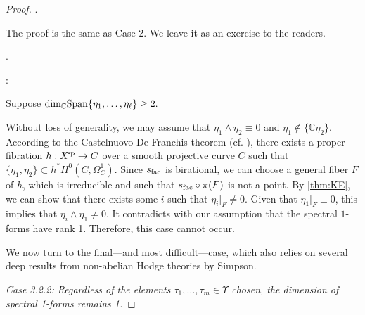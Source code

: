 \documentclass[english]{amsproc}
\theoremstyle{plain}
\theoremstyle{definition}
\theoremstyle{remark}
\theoremstyle{plain}
\numberwithin{equation}{thm} %
\newcommand{\cT}{\mathcal{T}}
\newcommand{\bC}{\mathbb{C}}
\newcommand{\xsp}{X^{\! \rm sp}}
\begin{document}
\begin{proof}
	
	.  
	
	The proof is the same as  Case 2. We leave it as an exercise to the readers. 
	
	.   
	
	: 
	 
	Suppose  
	$
	{\rm dim}_\bC{\rm Span}\{\eta_1,\ldots,\eta_\ell\}\geq 2.
	$ 
	 
	
	Without loss of generality, we may assume that $\eta_1\wedge\eta_2\equiv 0$ and $\eta_1\not\in \{\bC\eta_2\}$. 
	According to the Castelnuovo-De Franchis theorem (cf. \cite[Theorem 2.7]{ABCKT}), there exists a proper fibration $h:\xsp\to C$ over a smooth projective curve $C$ such that $\{\eta_1,\eta_2\}\subset h^*H^0(C,\Omega_C^1)$.  
	Since $s_{\rm fac}$ 
	is birational,  we can choose a general fiber $F$ of $h$, which is irreducible and  such that $s_{\rm fac}\circ\pi(F)$  
	is not a point. 
		By \cref{thm:KE}, we can show that there exists some $i$ such that $\eta_i|_{F}\neq 0$. 
		Given that  $\eta_1|_{F}\equiv 0$, this implies that $\eta_i\wedge\eta_1\neq 0$. It contradicts with our assumption that the spectral $1$-forms have rank 1.  
		Therefore, this case cannot occur. 
		
		\medspace
		
		We now turn to the final—and most difficult—case, which also relies on several deep results  from non-abelian Hodge theories by Simpson. 
		
		\medspace
		
		\noindent \textit{Case 3.2.2: Regardless of the elements $\tau_1,\ldots,\tau_m \in \Upsilon$ chosen, the dimension of    spectral 1-forms remains 1.} 
		

\end{proof}
\end{document}
